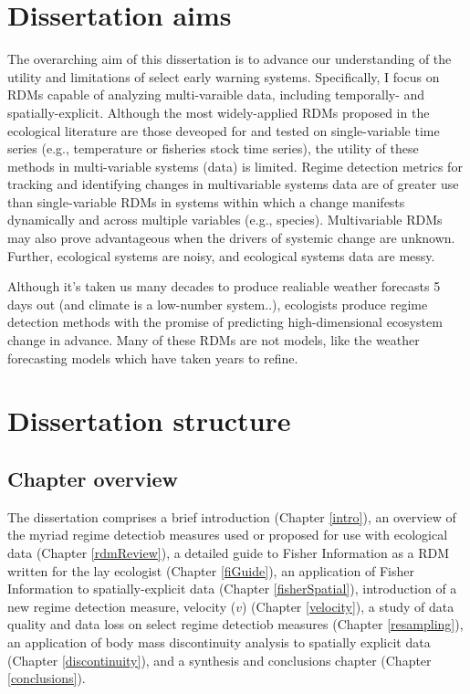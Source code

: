 \documentclass[12pt,twoside,openany]{reedthesis}
\begin{document}
\hypertarget{dissertation-aims}{%
\section{Dissertation aims}\label{dissertation-aims}}

The overarching aim of this dissertation is to advance our understanding of the utility and limitations of select early warning systems. Specifically, I focus on RDMs capable of analyzing multi-varaible data, including temporally- and spatially-explicit. Although the most widely-applied RDMs proposed in the ecological literature are those deveoped for and tested on single-variable time series (e.g., temperature or fisheries stock time series), the utility of these methods in multi-variable systems (data) is limited. Regime detection metrics for tracking and identifying changes in multivariable systems data are of greater use than single-variable RDMs in systems within which a change manifests dynamically and across multiple variables (e.g., species). Multivariable RDMs may also prove advantageous when the drivers of systemic change are unknown. Further, ecological systems are noisy, and ecological systems data are messy.

Although it's taken us many decades to produce realiable weather forecasts 5 days out (and climate is a low-number system..), ecologists produce regime detection methods with the promise of predicting high-dimensional ecosystem change in advance. Many of these RDMs are not models, like the weather forecasting models which have taken years to refine.

\hypertarget{dissertation-structure}{%
\section{Dissertation structure}\label{dissertation-structure}}

\hypertarget{chapter-overview}{%
\subsection{Chapter overview}\label{chapter-overview}}

The dissertation comprises a brief introduction (Chapter \ref{intro}), an overview of the myriad regime detectiob measures used or proposed for use with ecological data (Chapter \ref{rdmReview}), a detailed guide to Fisher Information as a RDM written for the lay ecologist (Chapter \ref{fiGuide}), an application of Fisher Information to spatially-explicit data (Chapter \ref{fisherSpatial}), introduction of a new regime detection measure, velocity (\(v\)) (Chapter \ref{velocity}), a study of data quality and data loss on select regime detectiob measures (Chapter \ref{resampling}), an application of body mass discontinuity analysis to spatially explicit data (Chapter \ref{discontinuity}), and a synthesis and conclusions chapter (Chapter \ref{conclusions}).
\end{document}
